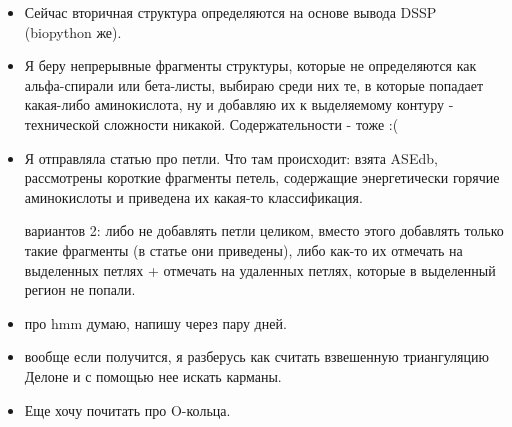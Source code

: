 \begin{itemize}
\item Сейчас вторичная структура определяются на основе вывода DSSP (biopython же).

\item Я беру непрерывные фрагменты структуры, которые не определяются как альфа-спирали или бета-листы, выбираю среди них те, в которые попадает какая-либо аминокислота, ну и добавляю их к выделяемому контуру - технической сложности никакой. Содержательности - тоже :(


\end{itemize}


\begin{itemize}
\item Я отправляла статью про петли. Что там происходит: взята ASEdb, рассмотрены короткие фрагменты петель, содержащие энергетически горячие аминокислоты и приведена их какая-то классификация.

вариантов 2: либо не добавлять петли целиком, вместо этого добавлять только такие фрагменты (в статье они приведены), либо как-то их отмечать на выделенных петлях + отмечать на удаленных петлях, которые в выделенный регион не попали.

\item про hmm думаю, напишу через пару дней.

\item вообще если получится, я разберусь как считать взвешенную триангуляцию Делоне и с помощью нее искать карманы.

\item Еще хочу почитать про O-кольца.

\end{itemize}
